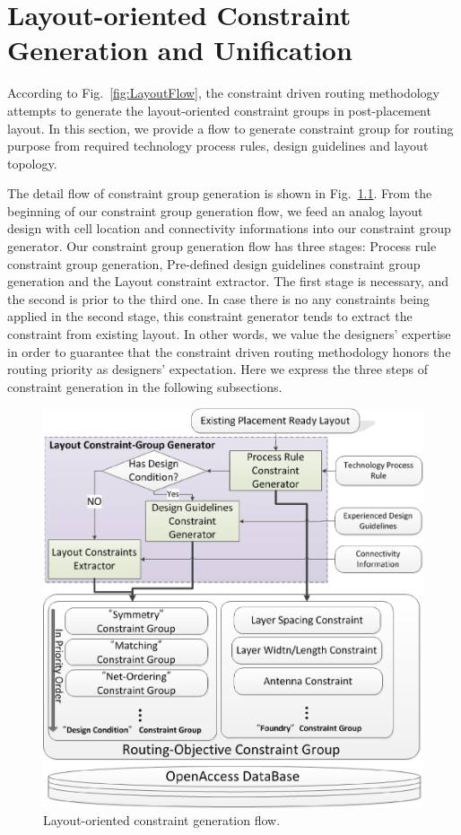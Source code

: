 \chapter{Layout-oriented Constraint Generation and Unification}\label{chap:cg}


  According to Fig.~\ref{fig:LayoutFlow}, the constraint driven routing methodology attempts to generate the layout-oriented constraint groups in post-placement layout. In this section, we provide a flow to generate constraint group for routing purpose from required technology process rules, design guidelines and layout topology. 
  
  The detail flow of constraint group generation is shown in Fig.~\ref{fig:LayoutCGGen}. From the beginning of our constraint group generation flow, we feed an analog layout design with cell location and connectivity informations into our constraint group generator. Our constraint group generation flow has three stages: Process rule constraint group generation, Pre-defined design guidelines constraint group generation and the Layout constraint extractor. The first stage is necessary, and the second is prior to the third one. In case there is no any constraints being applied in the second stage, this constraint generator tends to extract the constraint from existing layout. In other words, we value the designers' expertise in order to guarantee that the constraint driven routing methodology honors the routing priority as designers' expectation. Here we express the three steps of constraint generation in the following subsections. 
  
  \begin{figure}[t]
    \centering
      \includegraphics[width=\textwidth]{Fig/CG/LayoutConGen.eps}
      \caption{Layout-oriented constraint generation flow.}
      \label{fig:LayoutCGGen}
  \end{figure}

